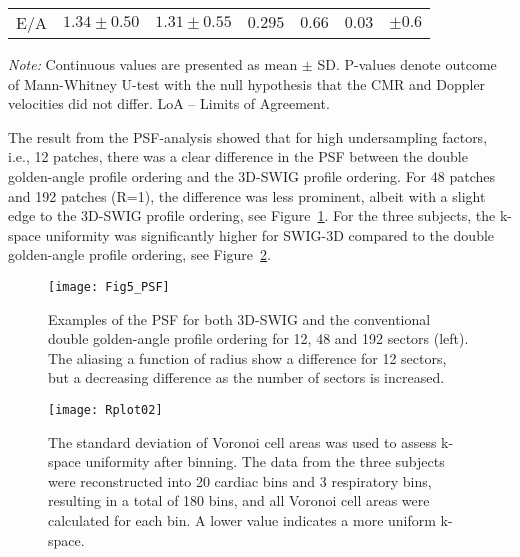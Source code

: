 \begin{table}[htbp]
\begin{center}
\begin{threeparttable}
\begin{tabular}{c c c c c c c}
    \myrowcolor E/A & $1.34 \pm 0.50$ & $1.31 \pm 0.55$ & $0.295$ & $0.66$ & $0.03$ & $\pm 0.6$ \\
\end{tabular}
\begin{tablenotes}
\emph{Note:} Continuous values are presented as mean $\pm$ SD. P-values denote outcome of Mann-Whitney U-test with the null hypothesis that the CMR and Doppler velocities did not differ. LoA – Limits of Agreement.\\
\end{tablenotes}
\end{threeparttable}
\end{center}
\label{table:study3summary}
\end{table}

The result from the PSF-analysis showed that for high undersampling factors, i.e., 12 patches, there was a clear difference in the PSF between the double golden-angle profile ordering and the 3D-SWIG profile ordering. For 48 patches and 192 patches (R=1), the difference was less prominent, albeit with a slight edge to the 3D-SWIG profile ordering, see Figure~\ref{fig:study4_1}. For the three subjects, the k-space uniformity was significantly higher for SWIG-3D compared to the double golden-angle profile ordering, see Figure~\ref{fig:study4_2}.
\begin{figure}[htbp]
    \centering
    \texttt{[image: Fig5\_PSF]}
    \caption{Examples of the PSF for both 3D-SWIG and the conventional double golden-angle profile ordering for 12, 48 and 192 sectors (left). The aliasing a function of radius show a difference for 12 sectors, but a decreasing difference as the number of sectors is increased.}
    \label{fig:study4_1}
\end{figure}
\begin{figure}[htbp]
    \centering
    \texttt{[image: Rplot02]}
    \caption{The standard deviation of Voronoi cell areas was used to assess k-space uniformity after binning. The data from the three subjects were reconstructed into 20 cardiac bins and 3 respiratory bins, resulting in a total of 180 bins, and all Voronoi cell areas were calculated for each bin. A lower value indicates a more uniform k-space.}
    \label{fig:study4_2}
\end{figure}


